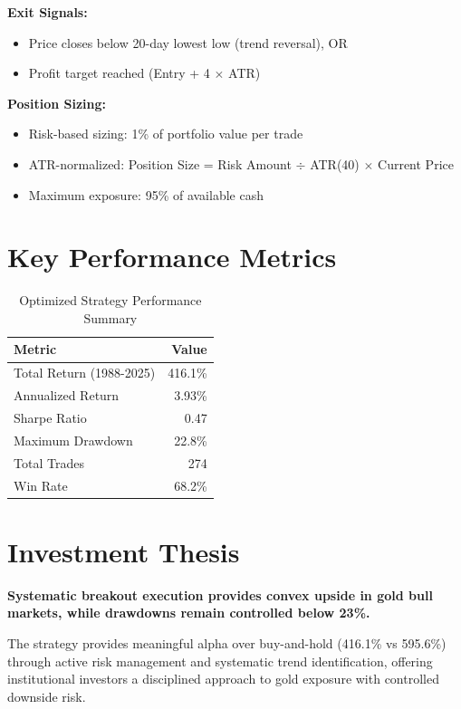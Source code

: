 \documentclass[11pt,a4paper]{article}
\begin{document}
\vspace{0.2cm}

\noindent
\textbf{Exit Signals:}
\begin{itemize}[leftmargin=*]
\item Price closes below 20-day lowest low (trend reversal), OR
\item Profit target reached (Entry + 4 $\times$ ATR)
\end{itemize}

\vspace{0.2cm}

\noindent
\textbf{Position Sizing:}
\begin{itemize}[leftmargin=*]
\item Risk-based sizing: 1\% of portfolio value per trade
\item ATR-normalized: Position Size = Risk Amount $\div$ ATR(40) $\times$ Current Price
\item Maximum exposure: 95\% of available cash
\end{itemize}

\section{Key Performance Metrics}
\begin{table}[H]
\centering
\begin{tabular}{lr}
\toprule
\textbf{Metric} & \textbf{Value} \\
\midrule
Total Return (1988-2025) & 416.1\% \\
Annualized Return & 3.93\% \\
Sharpe Ratio & 0.47 \\
Maximum Drawdown & 22.8\% \\
Total Trades & 274 \\
Win Rate & 68.2\% \\
\bottomrule
\end{tabular}
\caption{Optimized Strategy Performance Summary}
\end{table}

\section{Investment Thesis}
\noindent \textbf{Systematic breakout execution provides convex upside in gold bull markets, while drawdowns remain controlled below 23\%.}

\noindent The strategy provides meaningful alpha over buy-and-hold (416.1\% vs 595.6\%) through active risk management and systematic trend identification, offering institutional investors a disciplined approach to gold exposure with controlled downside risk.
\end{document}
